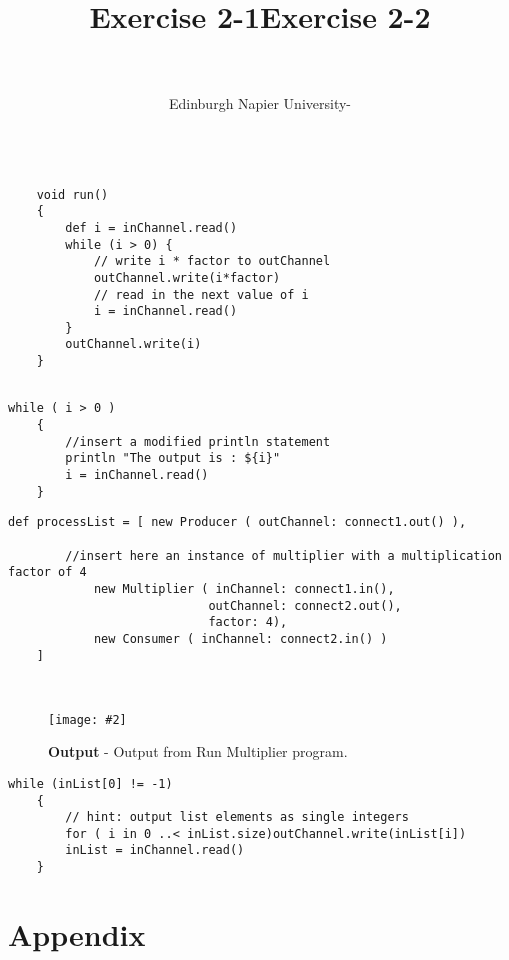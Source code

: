 \documentclass[10pt, a4paper]{article}
\title{\mytitle}
\author{\myauthor\hspace{1em}\\\contact\\Edinburgh Napier University\hspace{0.5em}-\hspace{0.5em}\mymodule}
\date{}
\newcommand{\figuremacro}[5]{
    \begin{figure}[#1]
        \centering
        \texttt{[image: \#2]}
        \caption[#3]{\textbf{#3}#4}
        \label{fig:#2}
    \end{figure}
}
\begin{document}
	\maketitle	

	\title{\textbf{Exercise 2-1}}
	\begin{lstlisting}[caption = "Multiplier.groovy"]

	void run()
	{
		def i = inChannel.read()
		while (i > 0) {
			// write i * factor to outChannel
			outChannel.write(i*factor)
			// read in the next value of i
			i = inChannel.read()
		}
		outChannel.write(i)
	}
		
	\end{lstlisting}
	
	\begin{lstlisting}[caption = "Consumer.groovy"]
	while ( i > 0 )
	{
	    //insert a modified println statement
	    println "The output is : ${i}"
	    i = inChannel.read()
	}
	\end{lstlisting}
	
	\begin{lstlisting}[caption = "RunMultiplier.groovy"]
	def processList = [ new Producer ( outChannel: connect1.out() ),
	
		//insert here an instance of multiplier with a multiplication factor of 4
			new Multiplier ( inChannel: connect1.in(),
							outChannel: connect2.out(),
							factor: 4),
			new Consumer ( inChannel: connect2.in() )
	]

	
	\end{lstlisting}
	
	\figuremacro{H}{2-1}{Output}{ - Output from Run Multiplier program.}{0.4}
	
	\title{\textbf{Exercise 2-2}}
	
	\begin{lstlisting}[caption = "ListToStream.groovy"]
	while (inList[0] != -1)
	{
		// hint: output	list elements as single integers
		for ( i in 0 ..< inList.size)outChannel.write(inList[i])
		inList = inChannel.read()
	}
	\end{lstlisting}
   
   
   

\clearpage
\section{Appendix}

		
\end{document}
